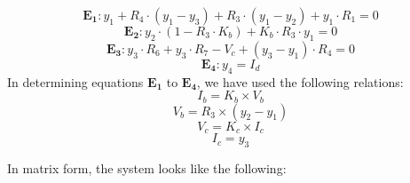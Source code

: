 \begin{equation*}
  \mathbf{E_1} : y_1 + R_4\cdot(y_1 - y_3) + R_3 \cdot(y_1 - y_2) + y_1 \cdot R_1 = 0
  \label{eq:kvlA}
\end{equation*}
\begin{equation*}
  \mathbf{E_2} : y_2 \cdot (1-R_3 \cdot K_b) + K_b \cdot R_3 \cdot y_1 = 0
  \label{eq:kvlB}
\end{equation*}
\begin{equation*}
  \mathbf{E_3} : y_3 \cdot R_6 + y_3 \cdot R_7 - V_c + (y_3 - y_1) \cdot R_4 = 0
  \label{eq:kvlC}
\end{equation*}
\begin{equation*}
  \mathbf{E_4} : y_4 = I_d
  \label{eq:kvlD}
\end{equation*}
In determining equations $\mathbf{E_1}$ to $\mathbf{E_4}$, we have used the following relations:
\begin{equation*}
  I_b=K_b \times V_b
  \label{eq:extra1}
\end{equation*}
\begin{equation*}
  V_b= R_3 \times (y_2-y_1)
  \label{eq:extra1}
\end{equation*}
\begin{equation*}
  V_c=K_c \times I_c
  \label{eq:extra2}
\end{equation*}
\begin{equation*}
    I_c = y_3
\end{equation*}


In matrix form, the system looks like the following:

\vspace{10mm}


